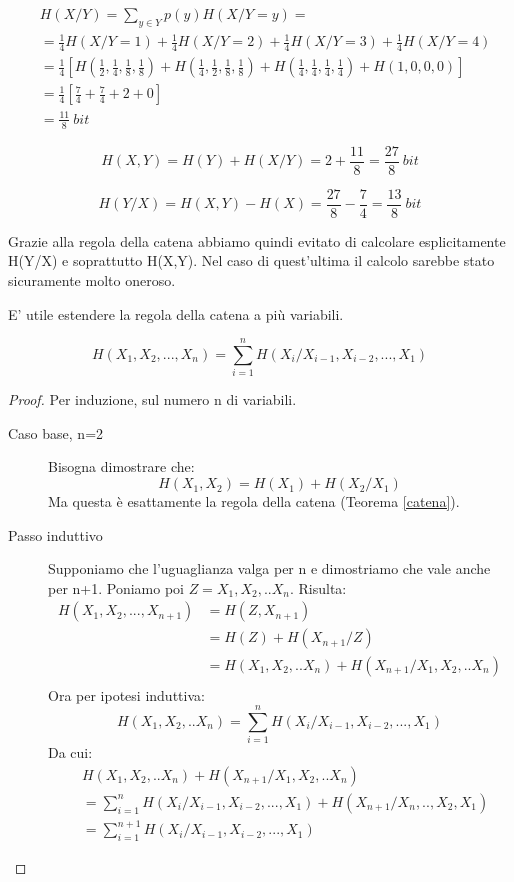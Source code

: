 \[
 \begin{split}
      &H(X/Y)
      = \sum_{y \in Y} p(y) H(X/Y=y)= \\
      &= \frac{1}{4} H(X/Y=1) + \frac{1}{4} H(X/Y=2) +\frac{1}{4} H(X/Y=3) +\frac{1}{4} H(X/Y=4) \\
      &= \frac{1}{4} \left [ 
        H \left( \frac{1}{2},\frac{1}{4},\frac{1}{8},\frac{1}{8} \right) +
        H \left( \frac{1}{4},\frac{1}{2},\frac{1}{8},\frac{1}{8} \right) +
        H \left( \frac{1}{4},\frac{1}{4},\frac{1}{4},\frac{1}{4} \right) +
        H \left(1,0,0,0 \right) 
       \right ]\\
      &= \frac{1}{4} \left [ \frac{7}{4} + \frac{7}{4} + 2 + 0 \right ] \\
      &= \frac{11}{8} \ bit
 \end{split}
\]

\[
  H(X,Y)=H(Y)+H(X/Y)=2+ \frac{11}{8}=\frac{27}{8} \ bit
\]

\[
 H(Y/X)=H(X,Y)-H(X)= \frac{27}{8}-\frac{7}{4}=\frac{13}{8} \ bit
\]

Grazie alla regola della catena abbiamo quindi evitato di calcolare esplicitamente H(Y/X)
e soprattutto H(X,Y). Nel caso di quest'ultima il calcolo sarebbe stato sicuramente molto oneroso.

\bigskip
\bigskip
\bigskip

E' utile estendere la regola della catena a più variabili.

\begin{teorema}
 \[ H(X_1,X_2,...,X_n)=\sum_{i=1}^n H(X_i/X_{i-1},X_{i-2},...,X_1) \]

\begin{proof}
 Per induzione, sul numero n di variabili.
\begin{description}
 \item[Caso base, n=2] Bisogna dimostrare che:
 \[
  H(X_1,X_2)=H(X_1)+H(X_2/X_1)
 \]
 Ma questa è esattamente la regola della catena (Teorema \ref{catena}).
 \item[Passo induttivo]
  Supponiamo che l'uguaglianza valga per n e dimostriamo che vale anche per n+1.
  Poniamo poi $Z=X_1,X_2,..X_n$. Risulta:
  \[\begin{split}
   H(X_1,X_2,...,X_{n+1})&=H(Z,X_{n+1}) \\
   &=H(Z)+H(X_{n+1}/Z) \\
   &=H(X_1,X_2,..X_n) + H(X_{n+1}/X_1,X_2,..X_n) \\
   \end{split}
  \]
  Ora per ipotesi induttiva:
  \[
   H(X_1,X_2,..X_n)=\sum_{i=1}^n H(X_i/X_{i-1},X_{i-2},...,X_1)
  \]
   Da cui:
  \[\begin{split}
   &H(X_1,X_2,..X_n) + H(X_{n+1}/X_1,X_2,..X_n) \\
   &=\sum_{i=1}^n H(X_i/X_{i-1},X_{i-2},...,X_1) + H(X_{n+1}/X_n,..,X_2,X_1) \\
   &=\sum_{i=1}^{n+1} H(X_i/X_{i-1},X_{i-2},...,X_1) 
   \end{split}
  \]

\end{description}

\end{proof}
\label{catenag}
\end{teorema}


